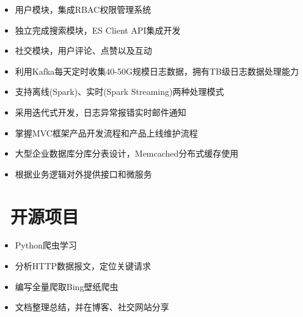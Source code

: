 \documentclass{resume}
\begin{document}
    \begin{onehalfspacing}
        \begin{itemize}
            \item 用户模块，集成RBAC权限管理系统
            \item 独立完成搜索模块，ES Client API集成开发
            \item 社交模块，用户评论、点赞以及互动
        \end{itemize}
    \end{onehalfspacing}
    \blankline{ }

    \begin{onehalfspacing}
        \begin{itemize}
            \item 利用Kafka每天定时收集40-50G规模日志数据，拥有TB级日志数据处理能力
            \item 支持离线(Spark)、实时(Spark Streaming)两种处理模式
            \item 采用迭代式开发，日志异常报错实时邮件通知
        \end{itemize}
    \end{onehalfspacing}
    \blankline{ }

    \begin{onehalfspacing}
        \begin{itemize}
            \item 掌握MVC框架产品开发流程和产品上线维护流程
            \item 大型企业数据库分库分表设计，Memcached分布式缓存使用
            \item 根据业务逻辑对外提供接口和微服务
        \end{itemize}
    \end{onehalfspacing}
    \blankline{ }

    \section{\faBriefcase\ 开源项目}
    \begin{onehalfspacing}
        \begin{itemize}
            \item Python爬虫学习
            \item 分析HTTP数据报文，定位关键请求
            \item 编写全量爬取Bing壁纸爬虫
            \item 文档整理总结，并在博客、社交网站分享
        \end{itemize}
    \end{onehalfspacing}
    \blankline{ }
\end{document}
